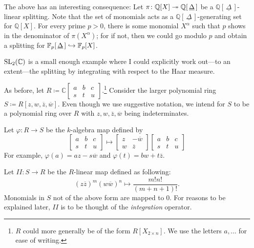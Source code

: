 \documentclass[12pt]{article}
\newcommand{\myint}{I\!I}
\begin{document}
The above has an interesting consequence: Let $\pi \colon \mathbb{Q}[X] \twoheadrightarrow \mathbb{Q}[\,\underline{\Delta}\,]$ be a $\mathbb{Q}[\,\underline{\Delta}\,]$-linear splitting. Note that the set of monomials acts as a $\mathbb{Q}[\,\underline{\Delta}\,]$-generating set for $\mathbb{Q}[X]$. For every prime $p > 0$, there is some monomial $X^{\alpha}$ such that $p$ shows in the denominator of $\pi(X^{\alpha})$; for if not, then we could go modulo $p$ and obtain a splitting for $\mathbb{F}_{p}[\,\underline{\Delta}\,] \hookrightarrow \mathbb{F}_{p}[X]$.

$\operatorname{SL}_{2}(\mathbb{C})$ is a small enough example where I could explicitly work out---to an extent---the splitting by integrating with respect to the Haar measure. 

As before, let $R \coloneqq \mathbb{C}\left[\begin{smallmatrix} a & b & c \\ s & t & u \end{smallmatrix}\right]$.\footnote{$R$ could more generally be of the form $R[X_{2 \times n}]$. We use the letters $a, \ldots$ for ease of writing.} Consider the larger polynomial ring $S \coloneqq R[z, w, \overline{z}, \overline{w}]$. Even though we use suggestive notation, we intend for $S$ to be a polynomial ring over $R$ with $z, w, \overline{z}, \overline{w}$ being indeterminates. 

Let $\varphi \colon R \to S$ be the $k$-algebra map defined by
\begin{equation*} 
	\begin{bmatrix}
		a & b & c \\ s & t & u
	\end{bmatrix}
	\mapsto 
	\begin{bmatrix}
		z & -\overline{w} \\ w & \overline{z}
	\end{bmatrix}
	\begin{bmatrix}
		a & b & c \\ s & t & u
	\end{bmatrix}
\end{equation*}
For example, $\varphi(a) = az - s\overline{w}$ and $\varphi(t) = bw + t\overline{z}$.

Let $\myint \colon S \to R$ be the $R$-linear map defined as following: 
\begin{equation*}
	(z \overline{z})^{m} (w \overline{w})^{n} \mapsto \frac{m! n!}{(m + n + 1)!}.
\end{equation*}
Monomials in $S$ not of the above form are mapped to $0$. \newline
For reasons to be explained later, $\myint$ is to be thought of the \emph{integration} operator.
\end{document}
